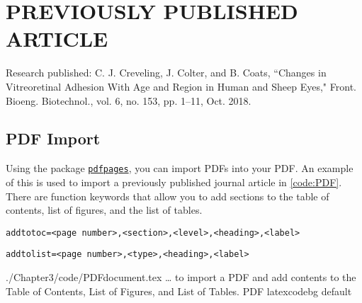\documentclass[../Dissertation]{subfiles}
\begin{document}
    \chapter[\uppercase{Previously published article}]{\uppercase{Previously published article}}\label{chp:3}
    
    
    Research published:  C. J. Creveling, J. Colter, and B. Coats, ``Changes in
    Vitreoretinal Adhesion With Age and Region in Human and Sheep Eyes," Front.
    Bioeng. Biotechnol., vol. 6, no. 153, pp. 1–11, Oct. 2018.
    
    
    
    \section{PDF Import}
        Using the  package
        \href{https://ctan.org/pkg/pdfpages?lang=en}{\texttt{pdfpages}}, you can
        import PDFs into your PDF.  An example of this is used to import a
        previously published journal article in \cref{code:PDF}.  There are
        function keywords that allow you to add sections to the table of
        contents, list of figures, and the list of tables.  
        
        \texttt{addtotoc={<page number>,<section>,<level>,<heading>,<label>}}
        
        \texttt{addtolist={<page number>,<type>,<heading>,<label>}}

        {./Chapter3/code/PDFdocument.tex} %
        {\ldots {} to import a PDF and add contents to the Table of
        Contents, List of Figures, and List of Tables.}
        {PDF}
        {\footnotesize}
        {latexcodebg}
        {default}

    \printbibliography[segment=\therefsegment,heading=references]
    
\end{document}
